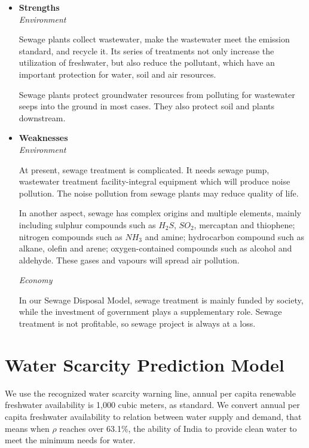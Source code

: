 \documentclass[tcn = 45538, sheet = true, abstract = true]{mcmthesis}
\begin{document}
\begin{itemize}

\item \textbf{Strengths} \\

\emph{Environment}

Sewage plants collect wastewater, 
make the wastewater meet the emission standard, 
and recycle it. 
Its series of treatments not only increase the utilization of freshwater, 
but also reduce the pollutant, 
which have an important protection for water, 
soil and air resources. 

Sewage plants protect groundwater resources from polluting for wastewater seeps into the ground in most cases. They also protect soil and plants downstream. 

\item \textbf{Weaknesses} \\

\emph{Environment}

At present, 
sewage treatment is complicated. 
It needs sewage pump, 
wastewater treatment facility-integral equipment which will produce noise pollution. 
The noise pollution from sewage plants may reduce quality of life. 

In another aspect, 
sewage has complex origins and multiple elements, 
mainly including sulphur compounds such as $H_{2}S$, 
$SO_{2}$, 
mercaptan and thiophene; 
nitrogen compounds such as $NH_{3}$ and amine; 
hydrocarbon compound such as alkane, 
olefin and arene; 
oxygen-contained compounds such as alcohol and aldehyde. 
These gases and vapours will spread air pollution.

\emph{Economy}

In our Sewage Disposal Model, 
sewage treatment is mainly funded by society, 
while the investment of government plays a supplementary role. 
Sewage treatment is not profitable, 
so sewage project is always at a loss.

\end{itemize}

\section{Water Scarcity Prediction Model}

\hspace{1.5 em} We use the recognized water scarcity warning line, 
annual per capita renewable freshwater availability is 1,000 cubic meters, 
as standard. 
We convert annual per capita freshwater availability to relation between water supply and demand, 
that means when $\rho$ reaches over 63.1\%, 
the ability of India to provide clean water to meet the minimum needs for water.
\end{document}

